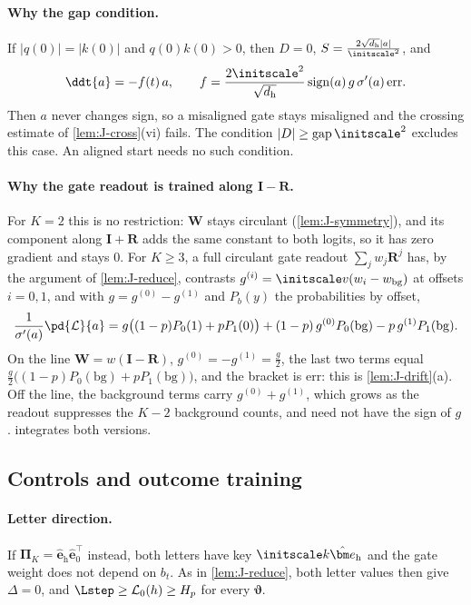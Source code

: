 \paragraph{Why the gap condition.}\label{rem:J-balance} If $|q(0)|=|k(0)|$ and $q(0)k(0)>0$, then $D=0$, $S=\frac{2\sqrt{d_{\mathrm h}}|a|}{\initscale^2}$, and
\[
 \ddt{a}=-f(t)\,a,\qquad f=\frac{2\initscale^2}{\sqrt{d_{\mathrm h}}}\operatorname{sign}(a)\,g\,\sigma'(a)\,\mathrm{err} .
\]
Then $a$ never changes sign, so a misaligned gate stays misaligned and the crossing estimate of \cref{lem:J-cross}(vi) fails. The condition
$|D|\ge\mathrm{gap}\,\initscale^2$ excludes this case. An aligned start needs no such condition.

\paragraph{Why the gate readout is trained along $\mathbf I-\mathbf R$.}\label{rem:J-line} For $K=2$ this is no restriction: $\mathbf W$ stays circulant
(\cref{lem:J-symmetry}), and its component along $\mathbf I+\mathbf R$ adds the same constant to both logits, so it has zero gradient and stays $0$.
For $K\ge3$, a full circulant gate readout $\sum_jw_j\mathbf R^j$ has, by the argument of \cref{lem:J-reduce}, contrasts $g^{(i)}=\initscale v(w_i-w_{\mathrm{bg}})$
at offsets $i=0,1$, and with $g=g^{(0)}-g^{(1)}$ and $P_b(y)$ the probabilities by offset,
\[
 \frac{1}{\sigma'(a)}\pd{\mathcal L}{a}=g\bigl((1-p)P_0(1)+pP_1(0)\bigr)+(1-p)\,g^{(0)}P_0(\mathrm{bg})-p\,g^{(1)}P_1(\mathrm{bg}).
\]
On the line $\mathbf W=w(\mathbf I-\mathbf R)$, $g^{(0)}=-g^{(1)}=\frac{g}{2}$, the last two terms equal $\frac{g}{2}\bigl((1-p)P_0(\mathrm{bg})+pP_1(\mathrm{bg})\bigr)$, and the bracket is
$\mathrm{err}$: this is \cref{lem:J-drift}(a). Off the line, the background terms carry $g^{(0)}+g^{(1)}$, which grows as the readout suppresses the $K-2$
background counts, and need not have the sign of $g$.  integrates both versions.


\subsection{Controls and outcome training}

\paragraph{Letter direction.} If $\bm\Pi_K=\hat{\bm e}_{\mathrm h}\hat{\bm e}_0^\top$ instead, both letters have key $\initscale k\hat{\bm e}_{\mathrm h}$ and the gate weight does not depend on $b_t$.
As in \cref{lem:J-reduce}, both letter values then give $\Delta=0$, and $\Lstep\ge \mathcal L_0(h)\ge H_p$ for every $\bm\vartheta$.

